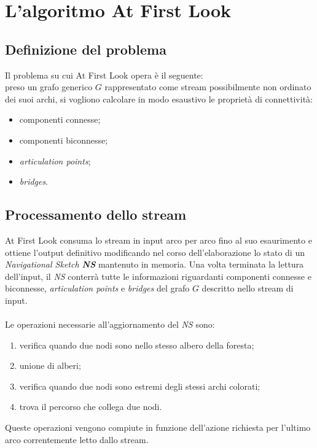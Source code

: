 \documentclass[a4paper,11pt]{report}
\begin{document}
\section{L'algoritmo At First Look}
\subsection{Definizione del problema}
Il problema su cui At First Look opera è il seguente:
\\
preso un grafo generico $G$ rappresentato come stream possibilmente non ordinato dei suoi archi, si vogliono calcolare in modo esaustivo le
proprietà di connettività:
\begin{itemize}
 \item componenti connesse;
 \item componenti biconnesse;
 \item \emph{articulation points};
 \item \emph{bridges}.
\end{itemize}

\subsection{Processamento dello stream}
At First Look consuma lo stream in input arco per arco fino al suo esaurimento e ottiene l'output definitivo modificando nel corso
dell'elaborazione lo stato di un
\emph{Navigational Sketch \textbf{NS}} mantenuto in memoria. Una volta terminata la lettura dell'input, il \emph{NS} conterrà tutte le
informazioni riguardanti 
componenti connesse e biconnesse, \emph{articulation points} e \emph{bridges} del grafo $G$ descritto nello stream di input.
\paragraph{}
Le operazioni necessarie all'aggiornamento del \emph{NS} sono: 
\begin{enumerate}
 \item verifica quando due nodi sono nello stesso albero della foresta;
 \item unione di alberi;
 \item verifica quando due nodi sono estremi degli stessi archi colorati;
 \item trova il percorso che collega due nodi.
\end{enumerate}
Queste operazioni vengono compiute in funzione dell'azione richiesta per l'ultimo arco correntemente letto dallo stream.
\end{document}

